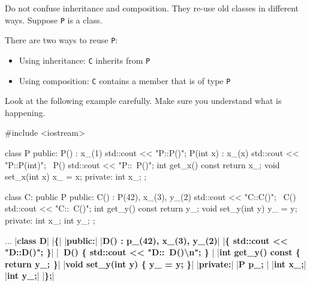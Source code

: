 \newpage{}

Do not confuse inheritance and composition. They re-use old classes in
different ways. Suppose \verb!P! is a class.

There are two ways to reuse \verb!P!:

\begin{itemize}
\item
  Using inheritance: \verb!C! inherits from \verb!P!
\item
  Using composition: \verb!C! contains a member that is of type \verb!P!
\end{itemize}

Look at the following example carefully. Make sure you understand what
is happening.
\begin{console}
#include <iostream>

class P
{
public:
        P() : x_(1) { std::cout << "P::P()\n"; }
        P(int x) : x_(x) { std::cout << "P::P(int)\n"; }
        ~P() { std::cout << "P::~P()\n"; }
        int get_x() const { return x_; }
        void set_x(int x) { x_ = x; }
private:
        int x_;
};

class C: public P
{
public:
        C() : P(42), x_(3), y_(2)
        { std::cout << "C::C()"; }
        ~C() { std::cout << "C::~C()\n"; }
        int get_y() const { return y_; }
        void set_y(int y) { y_ = y; }
private:
        int x_;
        int y_;
};
\end{console}

\newpage\begin{consolethree}[escapeinside=||]
...
|\textbf{class D}|
|\textbf{\{}|
|\textbf{public:}|
        |\textbf{D() : p\_(42), x\_(3), y\_(2)}|
        |\textbf{\{ std::cout << "D::D()"; \}}|
        |\textbf{~D() \{ std::cout << "D::~D()\textbackslash n"; \}} |
        |\textbf{int get\_y() const \{ return y\_; \}}|
        |\textbf{void set\_y(int y) \{ y\_ = y; \}}|
|\textbf{private:}|
        |\textbf{P p\_;} | 
        |\textbf{int x\_;}|
        |\textbf{int y\_;}|
|\textbf{\};}|
\end{consolethree}

